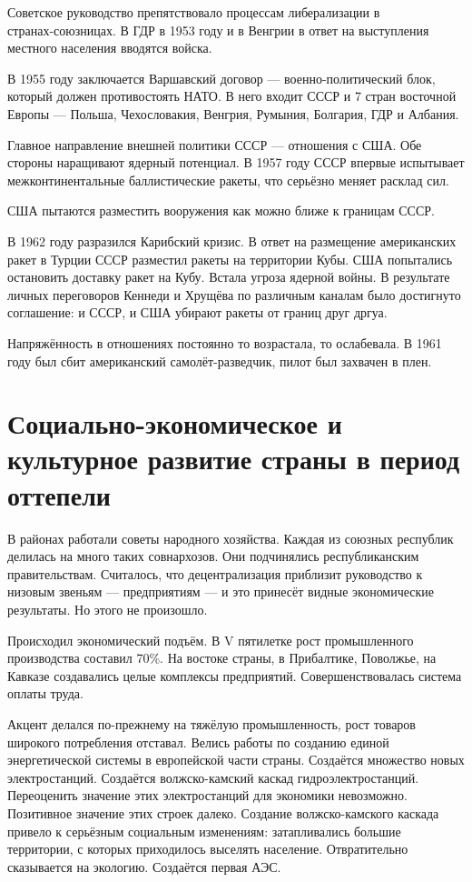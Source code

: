 \documentclass{article}
\begin{document}
Советское руководство препятствовало процессам либерализации в\\ странах-союзницах. В ГДР в 1953 году и в Венгрии в ответ на выступления местного населения вводятся войска.

В 1955 году заключается Варшавский договор --- военно-политический блок, который должен противостоять НАТО. В него входит СССР и 7 стран восточной Европы --- Польша, Чехословакия, Венгрия, Румыния, Болгария, ГДР и Албания.

Главное направление внешней политики СССР --- отношения с США. Обе стороны наращивают ядерный потенциал. В 1957 году СССР впервые испытывает межконтинентальные баллистические ракеты, что серьёзно меняет расклад сил.

США пытаются разместить вооружения как можно ближе к границам СССР.

В 1962 году разразился Карибский кризис. В ответ на размещение американских ракет в Турции СССР разместил ракеты на территории Кубы. США попытались остановить доставку ракет на Кубу. Встала угроза ядерной войны. В результате личных переговоров Кеннеди и Хрущёва по различным каналам было достигнуто соглашение: и СССР, и США убирают ракеты от границ друг дргуа.

Напряжённость в отношениях постоянно то возрастала, то ослабевала. В 1961 году был сбит американский самолёт-разведчик, пилот был захвачен в плен.

\section{Социально-экономическое и культурное развитие страны в период оттепели}
В районах работали советы народного хозяйства. Каждая из союзных республик делилась на много таких совнархозов. Они подчинялись республиканским правительствам. Считалось, что децентрализация приблизит руководство к низовым звеньям --- предприятиям --- и это принесёт видные экономические результаты. Но этого не произошло.

Происходил экономический подъём. В V пятилетке рост промышленного производства составил 70\%. На востоке страны, в Прибалтике, Поволжье, на Кавказе создавались целые комплексы предприятий. Совершенствовалась система оплаты труда.

Акцент делался по-прежнему на тяжёлую промышленность, рост товаров широкого потребления отставал. Велись работы по созданию единой энергетической системы в европейской части страны. Создаётся множество новых электростанций. Создаётся волжско-камский каскад гидроэлектростанций. Переоценить значение этих электростанций для экономики невозможно. Позитивное значение этих строек далеко. Создание волжско-камского каскада привело к серьёзным социальным изменениям: затапливались большие территории, с которых приходилось выселять население. Отвратительно сказывается на экологию. Создаётся первая АЭС.
\end{document}
